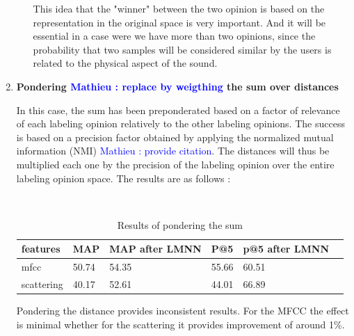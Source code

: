 \documentclass[hidelinks,12pt]{report}
\newcommand{\ml}[1]{\textcolor{blue}{ Mathieu : #1}}
\begin{document}
\begin{enumerate}
\begin{enumerate}
This idea that the "winner" between the two opinion is based on the representation in the original space is very important. And it will be essential in a case were we have more than two opinions, since the probability that two samples will be considered similar by the users is related to the physical aspect of the sound. 
 \end{enumerate}
 \item \textbf{Pondering \ml{replace by weigthing} the sum over distances} \par 
In this case, the sum has been preponderated based on a factor of relevance of each labeling opinion relatively to the other labeling opinions. The success is based on a precision factor obtained by applying the normalized mutual information (NMI) \ml{provide citation}. The distances will thus be multiplied each one by the precision of the labeling opinion over the entire labeling opinion space. The results are as follows :
\begin{table} [H]
\begin{center} 
\ 
 \setlength{\tabcolsep}{.16667em} 
\begin{tabular}{ | l | l | l | l | l | l |}
\hline
features & MAP & MAP after LMNN & P@5 & p@5 after LMNN  \\ 
\hline 
mfcc & 50.74& 54.35 & 55.66 & 60.51  \\ 
scattering & 40.17 & 52.61 & 44.01 & 66.89  \\ 
\hline
\end{tabular} 
\end{center} 
\caption{Results of pondering the sum} 
\label{you} 
\end{table} 
 
 Pondering the distance provides inconsistent results. For the MFCC the effect is minimal whether for the scattering it provides improvement of around 1\%.
 

\end{enumerate}
\end{document}
